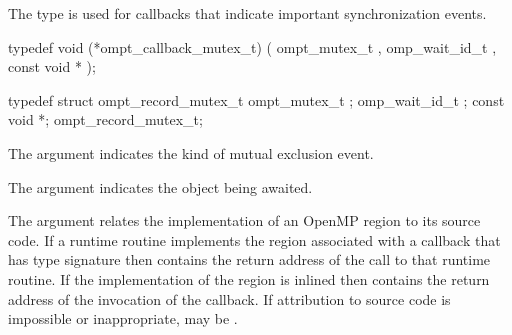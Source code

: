 \label{sec:ompt_callback_mutex_t}

\summary
The  type is used for callbacks that indicate
important synchronization events.

\format
\begin{ccppspecific}
\begin{omptCallback}
typedef void (*ompt_callback_mutex_t) (
  ompt_mutex_t ,
  omp_wait_id_t ,
  const void *
);
\end{omptCallback}
\end{ccppspecific}

\record
\begin{ccppspecific}
\begin{omptRecord}
typedef struct ompt_record_mutex_t {
  ompt_mutex_t ;
  omp_wait_id_t ;
  const void *;
} ompt_record_mutex_t;
\end{omptRecord}
\end{ccppspecific}

\argdesc
The  argument indicates the kind of mutual exclusion event.

The  argument indicates the object being awaited.

The  argument relates the implementation of an OpenMP region
to its source code. If a runtime routine implements the region associated with
a callback that has type signature  then
 contains the return address of the call to that runtime routine.
If the implementation of the region is inlined then  contains the
return address of the invocation of the callback. If attribution to source code
is impossible or inappropriate, may be .


